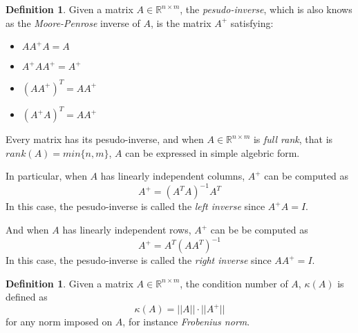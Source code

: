 \documentclass[12pt]{amsart}
\numberwithin{equation}{section}
\theoremstyle{definition}
\newtheorem{definition}[thm]{Definition}
\numberwithin{thm}{section}
\begin{document}
\begin{definition}
     Given a matrix $A \in \mathbb{R}^{n \times m}$, the \emph{pesudo-inverse},
     which is also knows as the \emph{Moore-Penrose} inverse of $A$, is the matrix
     $A^+$ satisfying:
     \begin{itemize}
          \item $A A^+ A = A$
          \item $A^+ A A^+ = A^+$
          \item $(A A^+)^T = A A^+$
          \item $(A^+ A)^T = A A^+$
        \end{itemize}
     
\end{definition}
\smallskip
     Every matrix has its pesudo-inverse, and when $A \in \mathbb{R}^{n \times m}$ is \emph{full rank}, 
     that is $rank(A) = min\{n, m\}$, $A$ can be expressed in simple algebric form.
     
     In particular, when $A$ has linearly independent columns, $A^+$ can be computed as
     \begin{equation}
          A^+ = (A^T A)^{-1} A^T
     \end{equation}
     In this case, the pesudo-inverse is called the \emph{left inverse} since $A^+ A = I$.

     \smallskip
     And when $A$ has linearly independent rows, $A^+$ can be be computed as
     \begin{equation}
          A^+ = A^T (A A^T)^{-1}
     \end{equation}
     In this case, the pesudo-inverse is called the \emph{right inverse} since $A A^+ = I$. 


\begin{definition}
     \label{def:COND}
     Given a matrix $A \in \mathbb{R}^{n \times m}$, the condition number of $A$, $\kappa(A)$ is defined as
     \begin{equation}
          \kappa(A) = ||A|| \cdot ||A^+||
     \end{equation}
     for any norm imposed on $A$, for instance \emph{Frobenius norm}.
\end{definition}
\end{document}
